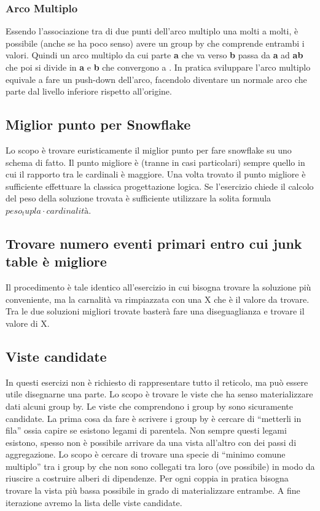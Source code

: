 \subsubsection{Arco Multiplo}
Essendo l'associazione tra di due punti dell'arco multiplo una molti a molti, è possibile (anche se ha poco senso) avere un group by che comprende entrambi i valori. Quindi un arco multiplo da cui parte \textbf{a} che va verso \textbf{b} passa da \textbf{a} ad \textbf{ab}  che poi si divide in \textbf{a} e \textbf{b} che convergono a {}. In pratica sviluppare l'arco multiplo equivale a fare un push-down dell'arco, facendolo diventare un normale arco che parte dal livello inferiore rispetto all'origine.
\subsection{Miglior punto per Snowflake}
Lo scopo è trovare euristicamente il miglior punto per fare snowflake su uno schema di fatto. Il punto migliore è (tranne in casi particolari) sempre quello in cui il rapporto tra le cardinali è maggiore. Una volta trovato il punto migliore è sufficiente effettuare la classica progettazione logica. Se l’esercizio chiede il calcolo del peso della soluzione trovata è sufficiente utilizzare la solita formula $peso_tupla \cdot cardinalità$.
\subsection{Trovare numero eventi primari entro cui junk table è migliore}
Il procedimento è tale identico all’esercizio in cui bisogna trovare la soluzione più conveniente, ma la carnalità va rimpiazzata con una X che è il valore da trovare. Tra le due soluzioni migliori trovate basterà fare una diseguaglianza e trovare il valore di X.
\subsection{Viste candidate}
In questi esercizi non è richiesto di rappresentare tutto il reticolo, ma può essere utile disegnarne una parte.  Lo scopo è trovare le viste che ha senso materializzare dati alcuni group by. Le viste che comprendono i group by sono sicuramente candidate. La prima cosa da fare è scrivere i group by è cercare di “metterli in fila” ossia capire se esistono legami di parentela. Non sempre questi legami esistono, spesso non è possibile arrivare da una vista all’altro con dei passi di aggregazione. Lo scopo è cercare di trovare una specie di “minimo comune multiplo” tra i group by che non sono collegati tra loro (ove possibile) in modo da riuscire a costruire alberi di dipendenze. Per ogni coppia in pratica bisogna trovare la vista più bassa possibile in grado di materializzare entrambe. A fine iterazione avremo la lista delle viste candidate.
